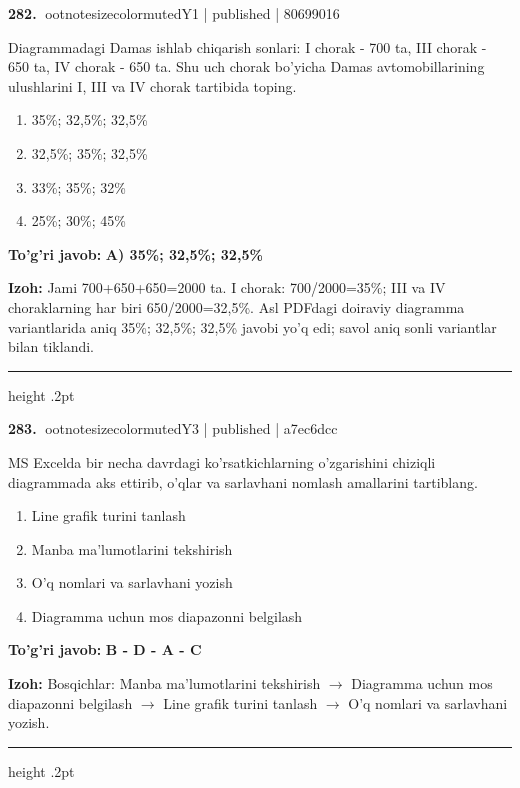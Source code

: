 \documentclass[10pt,a4paper]{article}
\begin{document}
\textbf{\color{ink}282.} {ootnotesizecolor{muted}Y1 | published | 80699016}
\par
Diagrammadagi Damas ishlab chiqarish sonlari: I chorak - 700 ta, III chorak - 650 ta, IV chorak - 650 ta. Shu uch chorak bo'yicha Damas avtomobillarining ulushlarini I, III va IV chorak tartibida toping.
\begin{enumerate}[label=\Alph*),leftmargin=9mm]
\item 35\%; 32,5\%; 32,5\%
\item 32,5\%; 35\%; 32,5\%
\item 33\%; 35\%; 32\%
\item 25\%; 30\%; 45\%
\end{enumerate}
\begin{tcolorbox}[enhanced,breakable,colback=teal!4,colframe=teal!55!black,boxrule=0.45pt,arc=1.2mm,left=2.8mm,right=2.8mm,top=2mm,bottom=2mm]
\textbf{\color{teal}To'g'ri javob:} \textbf{A) 35\%; 32,5\%; 32,5\%}
\par\smallskip
\textbf{Izoh:} Jami 700+650+650=2000 ta. I chorak: 700/2000=35\%; III va IV choraklarning har biri 650/2000=32,5\%. Asl PDFdagi doiraviy diagramma variantlarida aniq 35\%; 32,5\%; 32,5\% javobi yo'q edi; savol aniq sonli variantlar bilan tiklandi.
\end{tcolorbox}
\vspace{2mm}\hrule height .2pt\vspace{2mm}

\textbf{\color{ink}283.} {ootnotesizecolor{muted}Y3 | published | a7ec6dcc}
\par
MS Excelda bir necha davrdagi ko'rsatkichlarning o'zgarishini chiziqli diagrammada aks ettirib, o'qlar va sarlavhani nomlash amallarini tartiblang.
\begin{enumerate}[label=\Alph*),leftmargin=9mm]
\item Line grafik turini tanlash
\item Manba ma'lumotlarini tekshirish
\item O'q nomlari va sarlavhani yozish
\item Diagramma uchun mos diapazonni belgilash
\end{enumerate}
\begin{tcolorbox}[enhanced,breakable,colback=teal!4,colframe=teal!55!black,boxrule=0.45pt,arc=1.2mm,left=2.8mm,right=2.8mm,top=2mm,bottom=2mm]
\textbf{\color{teal}To'g'ri javob:} \textbf{B - D - A - C}
\par\smallskip
\textbf{Izoh:} Bosqichlar: Manba ma'lumotlarini tekshirish \ensuremath{\rightarrow} Diagramma uchun mos diapazonni belgilash \ensuremath{\rightarrow} Line grafik turini tanlash \ensuremath{\rightarrow} O'q nomlari va sarlavhani yozish.
\end{tcolorbox}
\vspace{2mm}\hrule height .2pt\vspace{2mm}
\end{document}
